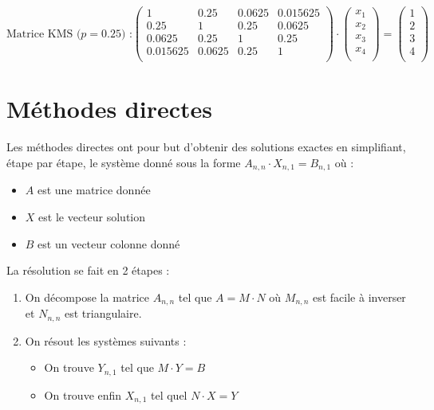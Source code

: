 \documentclass{report}
\begin{document}
        \begin{equation}
        \text{Matrice KMS (}
        p=0.25\text{) :}
        \begin{pmatrix}
          1 & 0.25 & 0.0625 & 0.015625 \\
          0.25 & 1 & 0.25 & 0.0625 \\
          0.0625 & 0.25 & 1 & 0.25 \\
          0.015625 & 0.0625 & 0.25 & 1 \\
        \end{pmatrix}
        \cdot
        \begin{pmatrix}
          x_1 \\
          x_2 \\
          x_3 \\
          x_4 \\
        \end{pmatrix}
        =
        \begin{pmatrix}
          1 \\
          2 \\
          3 \\
          4 \\
        \end{pmatrix}
        \label{syst10}
        \end{equation}

	  
  \chapter{Méthodes directes}
    Les méthodes directes ont pour but d'obtenir des solutions exactes en simplifiant, étape par étape, le système donné sous la forme 
    $A_{n,n} \cdot X_{n,1} = B_{n,1}$ où :
    \begin{itemize}
     \item{$A$ est une matrice donnée}
     \item{$X$ est le vecteur solution}
     \item{$B$ est un vecteur colonne donné}
    \end{itemize}
	\vspace{0.3cm}    
    La résolution se fait en 2 étapes :
    \begin{enumerate}
     \item{On décompose la matrice $A_{n,n}$ tel que $A = M \cdot N$ où $M_{n,n}$ est facile à inverser et $N_{n,n}$ est triangulaire.}
     \item{On résout les systèmes suivants : 
           \begin{itemize}
            \item{On trouve $Y_{n,1}$ tel que $M \cdot Y = B$}
            \item{On trouve enfin $X_{n,1} $ tel quel $N \cdot X = Y$}
           \end{itemize}
           }
    \end{enumerate}
    \newpage
\end{document}
